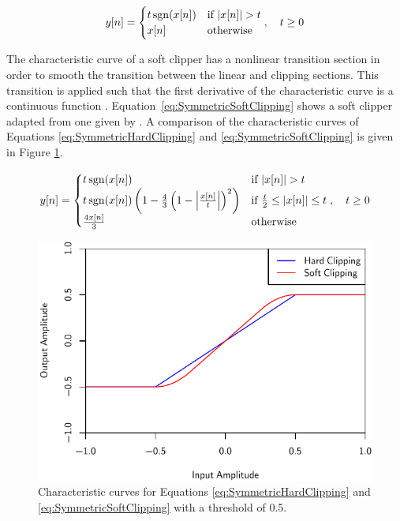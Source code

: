 		\begin{equation}
			y[n] = \begin{cases}
				t\operatorname{sgn}(x[n]) & \text{if $\left|x[n]\right| > t$} \\
				x[n] & \text{otherwise}
			\end{cases}, \quad t \geq 0
			\label{eq:SymmetricHardClipping}
		\end{equation}
		
		The characteristic curve of a soft clipper has a nonlinear transition section in order to smooth the
		transition between the linear and clipping sections. This transition is applied such that the first
		derivative of the characteristic curve is a continuous function \citep{esqueda2015aliasing}.
		Equation~\ref{eq:SymmetricSoftClipping} shows a soft clipper adapted from one given by
		\citet{dutilleux2011nonlinear}. A comparison of the characteristic curves of Equations
		\ref{eq:SymmetricHardClipping} and \ref{eq:SymmetricSoftClipping} is given in Figure \ref{fig:Clipping}.

		\begin{equation}
			y[n] = \begin{cases}
				t\operatorname{sgn}(x[n]) & \text{if $\left|x[n]\right| > t$} \\
				t\operatorname{sgn}(x[n]) \left( 1 - \frac{4}{3} \left( 1 - \left|\frac{x[n]}{t}\right| \right)^{2}
				           \right) & \text{if $\frac{t}{2} \leq \left|x[n]\right| \leq t$} \\
				\frac{4x[n]}{3} & \text{otherwise}
			\end{cases}, \quad t \geq 0
			\label{eq:SymmetricSoftClipping}
		\end{equation}

		\begin{figure}[h!]
			\centering
			\includegraphics{chapter3/Images/Clipping.pdf}
			\caption{Characteristic curves for Equations \ref{eq:SymmetricHardClipping} and
				 \ref{eq:SymmetricSoftClipping} with a threshold of 0.5.}
			\label{fig:Clipping}
		\end{figure}

